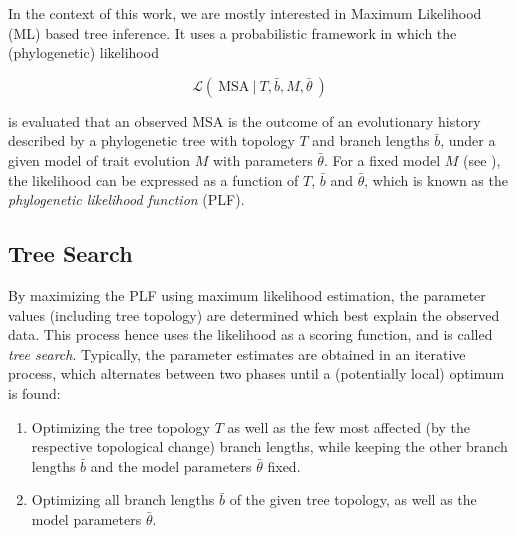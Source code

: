 In the context of this work, we are mostly interested in Maximum Likelihood (ML) based tree inference.
It uses a probabilistic framework in which the (phylogenetic) likelihood

\begin{equation}
    \label{ch:Foundations:sec:MLTreeInference:eq:likelihood}
    \mathcal{L}(~ \mbox{MSA} ~|~ T, \bar{b}, M, \bar{\theta} ~)
\end{equation}

is evaluated that an observed MSA is the outcome of an evolutionary history described by a phylogenetic tree
with topology $T$ and branch lengths $\bar{b}$, under a given model of trait evolution $M$ with parameters $\bar{\theta}$.
For a fixed model $M$ (see ),
the likelihood can be expressed as a function of $T$, $\bar{b}$ and $\bar{\theta}$,
which is known as the \emph{phylogenetic likelihood function} (PLF).


\subsection{Tree Search}
\label{ch:Foundations:sec:MLTreeInference:sub:TreeSearch}

By maximizing the PLF using maximum likelihood estimation,
the parameter values (including tree topology) are determined which best explain the observed data.
This process hence uses the likelihood as a scoring function, and is called \emph{tree search}.
Typically, the parameter estimates are obtained in an iterative process,
which alternates between two phases until a (potentially local) optimum is found:

\begin{enumerate}
    \item Optimizing the tree topology $T$ as well as the few most affected (by the respective topological change) branch lengths,
          while keeping the other branch lengths $\bar{b}$ and the model parameters $\bar{\theta}$ fixed.
    \item Optimizing all branch lengths $\bar{b}$ of the given tree topology, as well as the model parameters $\bar{\theta}$.
\end{enumerate}

